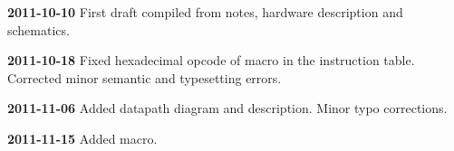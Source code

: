 



    

    
  

  {\bfseries 2011-10-10} First draft compiled from notes, hardware description
  and schematics.

  {\bfseries 2011-10-18} Fixed hexadecimal opcode of macro  in the
  instruction table. Corrected minor semantic and typesetting errors.
  
  {\bfseries 2011-11-06} Added datapath diagram and description. Minor typo
  corrections.

  {\bfseries 2011-11-15} Added  macro.

